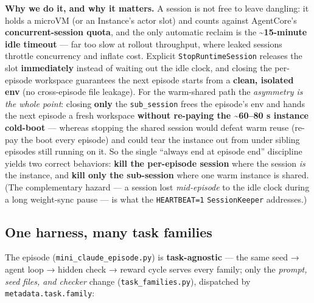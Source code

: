 \documentclass[
  paper=a4,
  ,captions=tableheading
]{scrartcl}
\begin{document}
\textbf{Why we do it, and why it matters.} A session is not free to
leave dangling: it holds a microVM (or an Instance's actor slot) and
counts against AgentCore's \textbf{concurrent-session quota}, and the
only automatic reclaim is the \textbf{\textasciitilde15-minute idle
timeout} --- far too slow at rollout throughput, where leaked sessions
throttle concurrency and inflate cost. Explicit
\texttt{StopRuntimeSession} releases the slot \textbf{immediately}
instead of waiting out the idle clock, and closing the per-episode
workspace guarantees the next episode starts from a \textbf{clean,
isolated env} (no cross-episode file leakage). For the warm-shared path
the \emph{asymmetry is the whole point}: closing \textbf{only} the
\texttt{sub\_session} frees the episode's env and hands the next episode
a fresh workspace \textbf{without re-paying the \textasciitilde60--80 s
instance cold-boot} --- whereas stopping the shared session would defeat
warm reuse (re-pay the boot every episode) and could tear the instance
out from under sibling episodes still running on it. So the single
``always end at episode end'' discipline yields two correct behaviors:
\textbf{kill the per-episode session} where the session \emph{is} the
instance, and \textbf{kill only the sub-session} where one warm instance
is shared. (The complementary hazard --- a session lost
\emph{mid-episode} to the idle clock during a long weight-sync pause ---
is what the \texttt{HEARTBEAT=1} \texttt{SessionKeeper} addresses.)

\hypertarget{one-harness-many-task-families}{%
\subsection{One harness, many task
families}\label{one-harness-many-task-families}}

The episode (\texttt{mini\_claude\_episode.py}) is
\textbf{task-agnostic} --- the same seed → agent loop → hidden check →
reward cycle serves every family; only the \emph{prompt, seed files, and
checker} change (\texttt{task\_families.py}), dispatched by
\texttt{metadata.task.family}:
\end{document}
